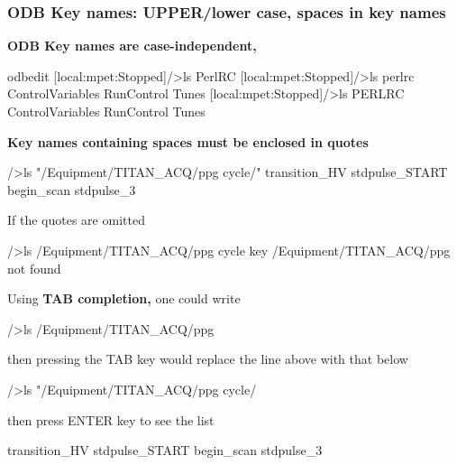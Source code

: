  \par
 \label{RC_odbedit_examples_idx_ODB_key_names}
\hypertarget{RC_odbedit_examples_idx_ODB_key_names}{}
 \hypertarget{RC_odbedit_examples_RC_odbedit_keynames}{}\subsubsection{ODB Key names: UPPER/lower case, spaces in key names}\label{RC_odbedit_examples_RC_odbedit_keynames}
{\bfseries ODB Key names are case-\/independent,} 
\begin{DoxyCode}
 odbedit
[local:mpet:Stopped]/>ls
PerlRC
[local:mpet:Stopped]/>ls perlrc
ControlVariables
RunControl
Tunes
[local:mpet:Stopped]/>ls PERLRC
ControlVariables
RunControl
Tunes
\end{DoxyCode}
 {\bfseries Key names containing spaces must be enclosed in quotes} 
\begin{DoxyCode}
/>ls "/Equipment/TITAN_ACQ/ppg cycle/"
transition_HV
stdpulse_START
begin_scan
stdpulse_3
\end{DoxyCode}
 If the quotes are omitted 
\begin{DoxyCode}
/>ls /Equipment/TITAN_ACQ/ppg cycle
key /Equipment/TITAN_ACQ/ppg not found
\end{DoxyCode}
 Using {\bfseries TAB completion,} one could write 
\begin{DoxyCode}
/>ls /Equipment/TITAN_ACQ/ppg  
\end{DoxyCode}
 then pressing the TAB key would replace the line above with that below 
\begin{DoxyCode}
/>ls "/Equipment/TITAN_ACQ/ppg cycle/ 
\end{DoxyCode}
 then press ENTER key to see the list 
\begin{DoxyCode}
transition_HV
stdpulse_START
begin_scan
stdpulse_3
\end{DoxyCode}


\label{RC_odbedit_examples_idx_ODB_corrupted}
\hypertarget{RC_odbedit_examples_idx_ODB_corrupted}{}
 

